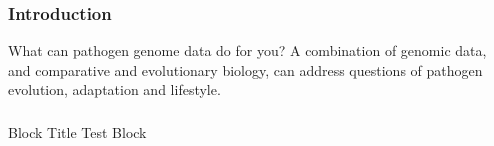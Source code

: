 
%
\begin{frame}
  \frametitle{Introduction}
    \begin{alertblock}{What can pathogen genome data do for you?}
        A combination of genomic data, and comparative and evolutionary biology, 
        can address questions of pathogen evolution, adaptation and lifestyle.
    \end{alertblock}
\end{frame}


\begin{frame}
  \frametitle{}

  \begin{block}{Block Title}
    Test Block
  \end{block}
\end{frame}